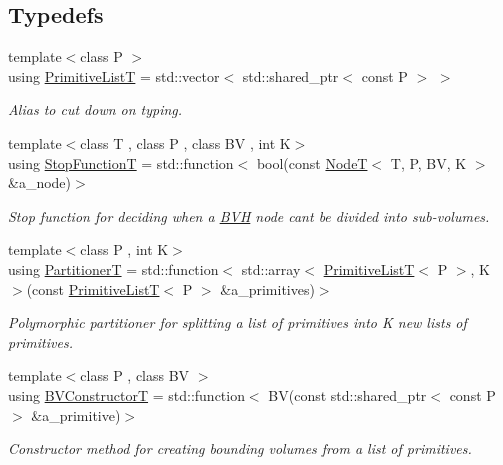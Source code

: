\subsection*{Typedefs}
\begin{DoxyCompactItemize}
\item 
\mbox{\label{namespaceBVH_aa1e753bda451b85cd5b948722a2ad7c7}} 
{\footnotesize template$<$class P $>$ }\\using \hyperlink{namespaceBVH_aa1e753bda451b85cd5b948722a2ad7c7}{Primitive\+ListT} = std\+::vector$<$ std\+::shared\+\_\+ptr$<$ const P $>$ $>$
\begin{DoxyCompactList}\small\item\em Alias to cut down on typing. \end{DoxyCompactList}\item 
{\footnotesize template$<$class T , class P , class BV , int K$>$ }\\using \hyperlink{namespaceBVH_afef1c5979c34a11d23b756cc09654bf9}{Stop\+FunctionT} = std\+::function$<$ bool(const \hyperlink{classBVH_1_1NodeT}{NodeT}$<$ T, P, BV, K $>$ \&a\+\_\+node)$>$
\begin{DoxyCompactList}\small\item\em Stop function for deciding when a \hyperlink{namespaceBVH}{B\+VH} node can\textquotesingle{}t be divided into sub-\/volumes. \end{DoxyCompactList}\item 
{\footnotesize template$<$class P , int K$>$ }\\using \hyperlink{namespaceBVH_a7c33d54da9893d506709b2ca96b76f55}{PartitionerT} = std\+::function$<$ std\+::array$<$ \hyperlink{namespaceBVH_aa1e753bda451b85cd5b948722a2ad7c7}{Primitive\+ListT}$<$ P $>$, K $>$(const \hyperlink{namespaceBVH_aa1e753bda451b85cd5b948722a2ad7c7}{Primitive\+ListT}$<$ P $>$ \&a\+\_\+primitives)$>$
\begin{DoxyCompactList}\small\item\em Polymorphic partitioner for splitting a list of primitives into K new lists of primitives. \end{DoxyCompactList}\item 
{\footnotesize template$<$class P , class BV $>$ }\\using \hyperlink{namespaceBVH_a245702d7eff40cdaedb5dff68c25a88a}{B\+V\+ConstructorT} = std\+::function$<$ BV(const std\+::shared\+\_\+ptr$<$ const P $>$ \&a\+\_\+primitive)$>$
\begin{DoxyCompactList}\small\item\em Constructor method for creating bounding volumes from a list of primitives. \end{DoxyCompactList}\end{DoxyCompactItemize}
